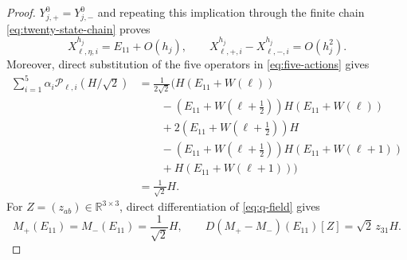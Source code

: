 \documentclass[]{article}
\numberwithin{equation}{section}
\theoremstyle{plain}
\theoremstyle{remark}
\begin{document}
\begin{proof}
$Y^0_{j,+}=Y^0_{j,-}$ and repeating this implication through the finite
chain \eqref{eq:twenty-state-chain} proves
\begin{equation}\label{eq:actual-limit-estimates}
 X^{h_j}_{\ell,\eta,i}=E_{11}+O(h_j),\qquad
 X^{h_j}_{\ell,+,i}-X^{h_j}_{\ell,-,i}=O(h_j^2).
\end{equation}
Moreover, direct substitution of the five operators in
\eqref{eq:five-actions} gives
\begin{equation}\label{eq:first-order-identity}
\begin{aligned}
 \sum_{i=1}^5\alpha_i\mathcal P_{\ell,i}(H/\sqrt2)
 &=\frac1{2\sqrt2}\bigl(
 H(E_{11}+W(\ell))\\
 &\qquad -(E_{11}+W(\ell+\tfrac12))H(E_{11}+W(\ell))\\
 &\qquad +2(E_{11}+W(\ell+\tfrac12))H\\
 &\qquad -(E_{11}+W(\ell+\tfrac12))H(E_{11}+W(\ell+1))\\
 &\qquad +H(E_{11}+W(\ell+1))\bigr)\\
 &=\frac1{\sqrt2}H.
\end{aligned}
\end{equation}
For $Z=(z_{ab})\in\mathbb R^{3\times3}$, direct differentiation of
\eqref{eq:q-field} gives
\begin{equation}\label{eq:centered-derivative}
 M_+(E_{11})=M_-(E_{11})=\frac1{\sqrt2}H,
 \qquad
 D(M_+-M_-)(E_{11})[Z]=\sqrt2\,z_{31}H.
\end{equation}


\end{proof}
\end{document}
